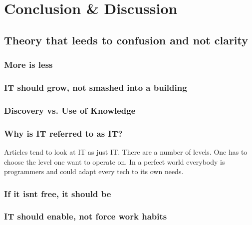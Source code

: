 \part{Conclusion \& Discussion}
\chapter{Theory that leeds to confusion and not clarity}
\section{More is less}
\section{IT should grow, not smashed into a building}
\section{Discovery vs. Use of Knowledge}
\section{Why is IT referred to as IT? }
Articles tend to look at IT as just IT. There are a number of levels. One has to choose the level one want to operate on.
In a perfect world everybody is programmers and could adapt every tech to its own needs. 
\section{If it isnt free, it should be}
\section{IT should enable, not force work habits}
